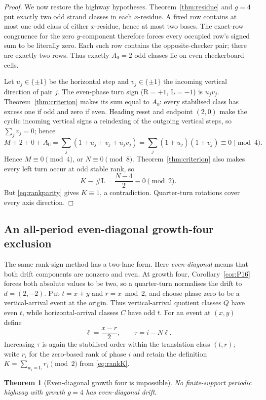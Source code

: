 \documentclass[11pt,letterpaper]{article}
\theoremstyle{plain}
\newtheorem{theorem}{Theorem}[section]
\theoremstyle{definition}
\newcommand{\drift}{d}
\newcommand{\growth}{g}
\newcommand{\turnR}{\mathrm{R}}
\newcommand{\turnL}{\mathrm{L}}
\begin{document}
\begin{NoHyper}
\begin{proof}
We now restore the highway hypotheses.  Theorem~\ref{thm:residue} and
$\growth=4$ put exactly two odd strand classes in each $x$-residue.  A fixed row
contains at most one odd class of either $x$-residue, hence at most two bases.  The
exact-row congruence for the zero $y$-component therefore forces every occupied row's
signed sum to be literally zero.  Each such row contains the opposite-checker pair;
there are exactly two rows.  Thus exactly $A_0=2$
odd classes lie on even checkerboard cells.

Let $u_j\in\{\pm1\}$ be the horizontal step and $v_j\in\{\pm1\}$ the incoming
vertical direction of pair $j$.  The even-phase turn sign ($\turnR=+1$,
$\turnL=-1$) is $u_jv_j$.  Theorem~\ref{thm:criterion} makes its sum equal to
$A_0$: every stabilised class has excess one if odd and zero if even.  Heading reset
and endpoint $(2,0)$ make the cyclic incoming vertical signs a reindexing of the
outgoing vertical steps, so $\sum_jv_j=0$; hence
\[
M+2+0+A_0
=\sum_j(1+u_j+v_j+u_jv_j)
=\sum_j(1+u_j)(1+v_j)\equiv0\pmod4.
\]
Hence $M\equiv0\pmod4$, or $N\equiv0\pmod8$.  Theorem~\ref{thm:criterion} also makes every left turn occur
at odd stable rank, so
\[
K\equiv\#\turnL=\frac{N-4}{2}\equiv0\pmod2.
\]
But \eqref{eq:rankparity} gives $K\equiv1$, a contradiction.  Quarter-turn rotations
cover every axis direction.
\end{proof}

\subsection{An all-period even-diagonal growth-four exclusion}

The same rank-sign method has a two-lane form.  Here \emph{even-diagonal} means
that both drift components are nonzero and even.  At growth four,
Corollary~\ref{cor:P16} forces both absolute values to be two, so a quarter-turn
normalises the drift to $\drift=(2,-2)$.  Put $t=x+y$ and $r=x\bmod2$, and choose phase zero to be a
vertical-arrival event at the origin.  Thus vertical-arrival quotient classes $Q$
have even $t$, while horizontal-arrival classes $C$ have odd $t$.  For an event at
$(x,y)$ define
\[
 \ell=\frac{x-r}{2},\qquad \tau=i-N\ell .
\]
Increasing $\tau$ is again the stabilised order within the translation class
$(t,r)$; write $r_i$ for the zero-based rank of phase $i$ and retain the definition
$K=\sum_{w_i=\turnL}r_i\pmod2$ from \eqref{eq:rankK}.

\begin{theorem}[Even-diagonal growth four is impossible]\label{thm:evendiagg4}
No finite-support periodic highway with growth $\growth=4$ has even-diagonal drift.
\end{theorem}


\end{NoHyper}
\end{document}
